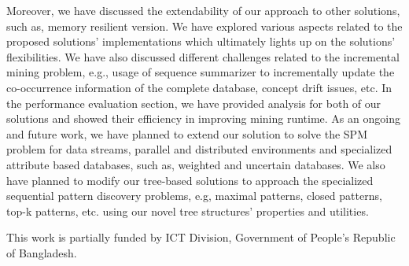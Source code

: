 Moreover, we have discussed the extendability of our approach to other solutions, such as, memory resilient version. We have explored various aspects related to the proposed solutions' implementations which ultimately lights up on the solutions' flexibilities. We have also discussed different challenges related to the incremental mining problem, e.g., usage of sequence summarizer to incrementally update the co-occurrence information of the complete database, concept drift issues, etc. In the performance evaluation section, we have provided analysis for both of our solutions and showed their efficiency in improving mining runtime. As an ongoing and future work, we have planned to extend our solution to solve the SPM problem for data streams, parallel and distributed environments and specialized attribute based databases, such as, weighted and uncertain databases. We also have planned to modify our tree-based solutions to approach the specialized sequential pattern discovery problems, e.g, maximal patterns, closed patterns, top-k patterns, etc. using our novel tree structures' properties and utilities.

\begin{acknowledgements}
This work is partially funded by ICT Division, Government of People’s Republic of Bangladesh.
\end{acknowledgements}

%

%
%
%


%
%



